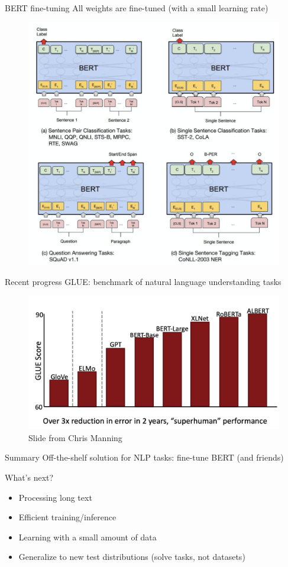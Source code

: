 \documentclass[usenames,dvipsnames,notes]{beamer}
\begin{document}
\begin{frame}
    {BERT fine-tuning}
    All weights are fine-tuned (with a small learning rate)
    \vspace{-1em}
    \begin{figure}
            \includegraphics[width=.8\textwidth]{figures/bert-finetuning}
    \end{figure}
\end{frame}

\begin{frame}
    {Recent progress}
    GLUE: benchmark of natural language understanding tasks
    \begin{figure}
            \includegraphics[width=.8\textwidth]{figures/glue}
            \caption{Slide from Chris Manning}
    \end{figure}
\end{frame}

\begin{frame}
    {Summary}
    Off-the-shelf solution for NLP tasks: fine-tune BERT (and friends)

    What's next?\\
    \begin{itemize}
        \item Processing long text
        \item Efficient training/inference
        \item Learning with a small amount of data
        \item Generalize to new test distributions (solve tasks, not datasets)
    \end{itemize}
\end{frame}
\end{document}

